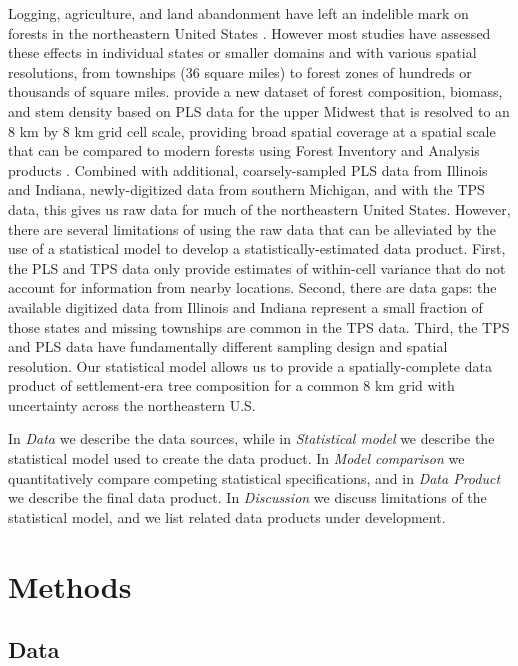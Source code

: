 \documentclass[10pt,letterpaper]{article}
\begin{document}
Logging, agriculture, and land abandonment have left an indelible
mark on forests in the northeastern United States \cite{foster1998land,rhemtulla2009legacies,thompson2013four,goring2015tr}.
However most studies have assessed these effects in individual states
or smaller domains \cite{friedman2005regional,rhemtulla2009historical}
and with various spatial resolutions, from townships (36 square miles)
to forest zones of hundreds or thousands of square miles. \cite{goring2015tr}
provide a new dataset of forest composition, biomass, and stem density
based on PLS data for the upper Midwest that is resolved to an 8 km
by 8 km grid cell scale, providing broad spatial coverage at a spatial
scale that can be compared to modern forests using Forest Inventory
and Analysis products \cite{gray2012forest}. Combined with additional,
coarsely-sampled PLS data from Illinois and Indiana, newly-digitized
data from southern Michigan, and with the TPS data, this gives us
raw data for much of the northeastern United States. However, there
are several limitations of using the raw data that can be alleviated
by the use of a statistical model to develop a statistically-estimated
data product. First, the PLS and TPS data only provide estimates of
within-cell variance that do not account for information from nearby
locations. Second, there are data gaps: the available digitized data
from Illinois and Indiana represent a small fraction of those states
and missing townships are common in the TPS data. Third, the TPS and
PLS data have fundamentally different sampling design and spatial
resolution. Our statistical model allows us to provide a spatially-complete
data product of settlement-era tree composition for a common 8 km
grid with uncertainty across the northeastern U.S.

In \emph{Data} we describe the data sources, while in \emph{Statistical model}
we describe the statistical model used to create the data product.
In \emph{Model comparison} we quantitatively compare competing
statistical specifications, and in \emph{Data Product}
we describe the final data product. In \emph{Discussion}
we discuss limitations of the statistical model, and we list related
data products under development.


\section*{Methods}



\subsection*{Data\label{sec:Data}}
\end{document}
